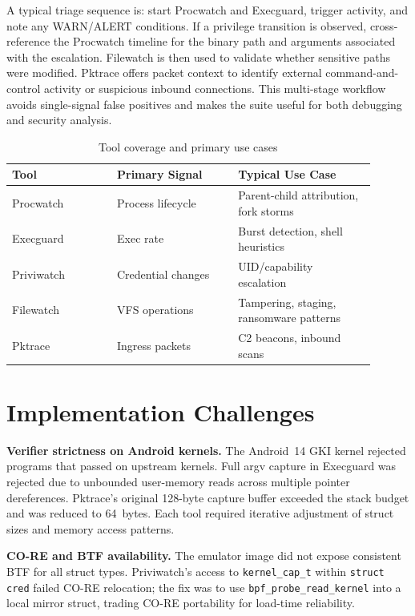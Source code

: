 \documentclass[conference]{IEEEtran}
\begin{document}
A typical triage sequence is: start Procwatch and Execguard, trigger activity, and note any WARN/ALERT conditions. If a privilege transition is observed, cross-reference the Procwatch timeline for the binary path and arguments associated with the escalation. Filewatch is then used to validate whether sensitive paths were modified. Pktrace offers packet context to identify external command-and-control activity or suspicious inbound connections. This multi-stage workflow avoids single-signal false positives and makes the suite useful for both debugging and security analysis.

\begin{table}[H]
  \centering
  \caption{Tool coverage and primary use cases}
  \label{tab:usecases}
  \begin{tabular}{|p{0.26\linewidth}|p{0.30\linewidth}|p{0.34\linewidth}|}
    \hline
    \textbf{Tool} & \textbf{Primary Signal} & \textbf{Typical Use Case} \\ \hline
    Procwatch & Process lifecycle & Parent-child attribution, fork storms \\ \hline
    Execguard & Exec rate & Burst detection, shell heuristics \\ \hline
    Priviwatch & Credential changes & UID/capability escalation \\ \hline
    Filewatch & VFS operations & Tampering, staging, ransomware patterns \\ \hline
    Pktrace & Ingress packets & C2 beacons, inbound scans \\ \hline
  \end{tabular}
\end{table}

\section{Implementation Challenges}

\textbf{Verifier strictness on Android kernels.} The Android~14 GKI kernel rejected programs that passed on upstream kernels. Full argv capture in Execguard was rejected due to unbounded user-memory reads across multiple pointer dereferences. Pktrace's original 128-byte capture buffer exceeded the stack budget and was reduced to 64~bytes. Each tool required iterative adjustment of struct sizes and memory access patterns.

\textbf{CO-RE and BTF availability.} The emulator image did not expose consistent BTF for all struct types. Priviwatch's access to \texttt{kernel\_cap\_t} within \texttt{struct cred} failed CO-RE relocation; the fix was to use \texttt{bpf\_probe\_read\_kernel} into a local mirror struct, trading CO-RE portability for load-time reliability.
\end{document}

